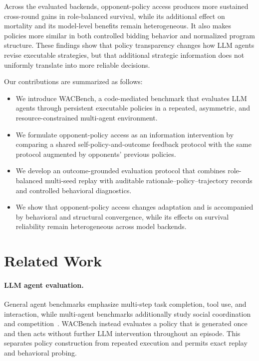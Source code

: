 \documentclass[letterpaper]{article} %
\begin{document}
Across the evaluated backends, opponent-policy access produces more sustained
cross-round gains in role-balanced survival, while its additional effect on
mortality and its model-level benefits remain heterogeneous. It also makes
policies more similar in both controlled bidding behavior and normalized
program structure. These findings show that policy transparency changes how
LLM agents revise executable strategies, but that additional strategic
information does not uniformly translate into more reliable decisions.

Our contributions are summarized as follows:

\begin{itemize}
    \item We introduce WACBench, a code-mediated benchmark that evaluates
    LLM agents through persistent executable policies in a repeated,
    asymmetric, and resource-constrained multi-agent environment.
    
    \item We formulate opponent-policy access as an information intervention
    by comparing a shared self-policy-and-outcome feedback protocol with the
    same protocol augmented by opponents' previous policies.
    
    \item We develop an outcome-grounded evaluation protocol that combines
    role-balanced multi-seed replay with auditable rationale--policy--trajectory
    records and controlled behavioral diagnostics.
    
    \item We show that opponent-policy access changes adaptation and is
    accompanied by behavioral and structural convergence, while its effects
    on survival reliability remain heterogeneous across model backends.
\end{itemize}
\section{Related Work}

\paragraph{LLM agent evaluation.}
General agent benchmarks emphasize multi-step task completion, tool use,
and interaction, while multi-agent benchmarks additionally study social
coordination and competition~\cite{liu2023agentbench,mialon2023gaia,zhou2024sotopia,zhu2025multiagentbench}.
WACBench instead evaluates a policy that is generated once and then acts
without further LLM intervention throughout an episode. This separates
policy construction from repeated execution and permits exact replay and
behavioral probing.
\end{document}
